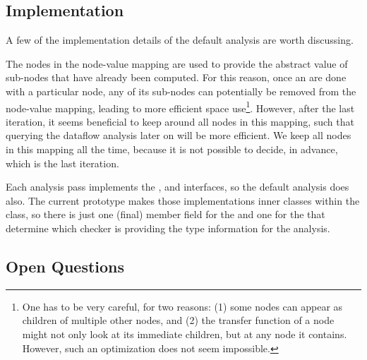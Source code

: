 \subsection{Implementation}

A few of the implementation details of the default analysis are worth discussing.


The nodes in the node-value mapping are used to provide the abstract value of sub-nodes
that have already been computed.  For this reason, once an are done with a particular node,
any of its sub-nodes can potentially be removed from the node-value mapping,
leading to more efficient space use\footnote{One has to be very careful, for two reasons: (1)
some nodes can appear as children of multiple other nodes, and (2) the transfer function of
a node might not only look at its immediate children, but at any node it contains.  However,
such an optimization does not seem impossible.}.
However, after the last iteration, it seems beneficial to keep around all nodes in this mapping,
such that querying the dataflow analysis later on will be more efficient.  We keep all nodes in this mapping
all the time, because it is not
possible to decide, in advance, which is the last iteration.

Each analysis pass implements the ,  and 
 interfaces, so the
default analysis does also.  The current prototype makes those implementations inner
classes within the  class, so there is just one (final) member field
for the  and one for the  that determine 
which checker is providing the type information for the analysis.


\subsection{Open Questions}

